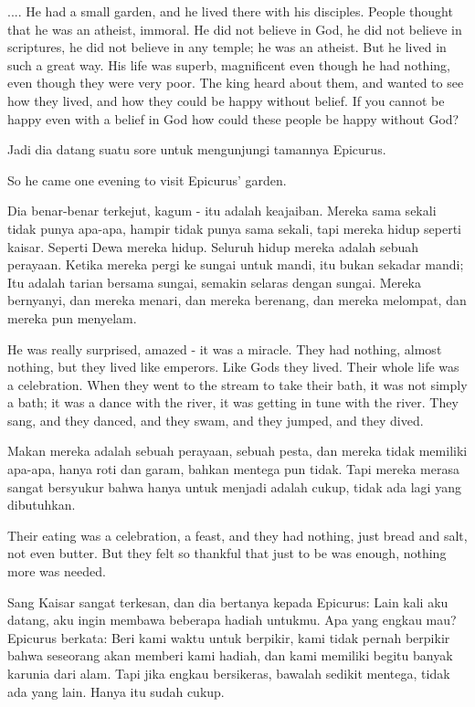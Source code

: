 \english
.... He had a small garden, and he lived there with his disciples. People thought that he was an atheist, immoral. He did not believe in God, he did not believe in scriptures, he did not believe in any temple; he was an atheist. But he lived in such a great way. His life was superb, magnificent even though he had nothing, even though they were very poor. The king heard about them, and wanted to see how they lived, and how they could be happy without belief. If you cannot be happy even with
a belief in God how could these people be happy without God?

\bahasa
Jadi dia datang suatu sore untuk mengunjungi tamannya Epicurus.

\english
So he came one evening to visit Epicurus' garden.

\bahasa
Dia benar-benar terkejut, kagum - itu adalah keajaiban. Mereka sama sekali tidak punya apa-apa, hampir tidak punya sama sekali, tapi mereka hidup seperti kaisar. Seperti Dewa mereka hidup. Seluruh hidup mereka adalah sebuah perayaan. Ketika mereka pergi ke sungai untuk mandi, itu bukan sekadar mandi; Itu adalah tarian bersama sungai, semakin selaras dengan sungai. Mereka bernyanyi, dan mereka menari, dan mereka berenang, dan mereka melompat, dan mereka pun menyelam.

\english
He was really surprised, amazed - it was a miracle. They had nothing, almost nothing, but they lived like emperors. Like Gods they lived. Their whole life was a celebration. When they went to the stream to take their bath, it was not simply a bath; it was a dance with the river, it was getting in tune with the river. They sang, and they danced, and they swam, and they jumped, and they dived.

\bahasa
Makan mereka adalah sebuah perayaan, sebuah pesta, dan mereka tidak memiliki apa-apa, hanya roti dan garam, bahkan mentega pun tidak. Tapi mereka merasa sangat bersyukur bahwa hanya untuk menjadi adalah cukup, tidak ada lagi yang dibutuhkan.

\english
Their eating was a celebration, a feast, and they had nothing, just bread and salt, not even butter. But they felt so thankful that just to be was enough, nothing more was needed.

\bahasa
Sang Kaisar sangat terkesan, dan dia bertanya kepada Epicurus: Lain kali aku datang, aku ingin membawa beberapa hadiah untukmu. Apa yang engkau mau? Epicurus berkata: Beri kami waktu untuk berpikir, kami tidak pernah berpikir bahwa seseorang akan memberi kami hadiah, dan kami memiliki begitu banyak karunia dari alam. Tapi jika engkau bersikeras, bawalah sedikit mentega, tidak ada yang lain. Hanya itu sudah cukup.

